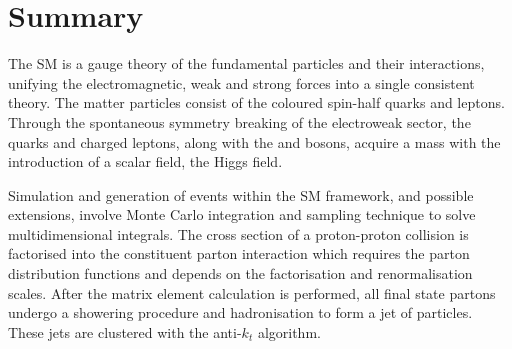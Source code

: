 \section{Summary}

The SM is a gauge theory of the fundamental particles and their interactions, unifying the electromagnetic, weak and strong forces into a single consistent theory. The matter particles consist of the coloured spin-half quarks and leptons. Through the spontaneous symmetry breaking of the electroweak sector, the quarks and charged leptons, along with the \PW and \PZ bosons, acquire a mass with the introduction of a scalar field, the Higgs field.

Simulation and generation of events within the SM framework, and possible extensions, involve Monte Carlo integration and sampling technique to solve multidimensional integrals. The cross section of a proton-proton collision is factorised into the constituent parton interaction which requires the parton distribution functions and depends on the factorisation and renormalisation scales. After the matrix element calculation is performed, all final state partons undergo a showering procedure and hadronisation to form a jet of particles. These jets are clustered with the anti-$k_t$ algorithm.
